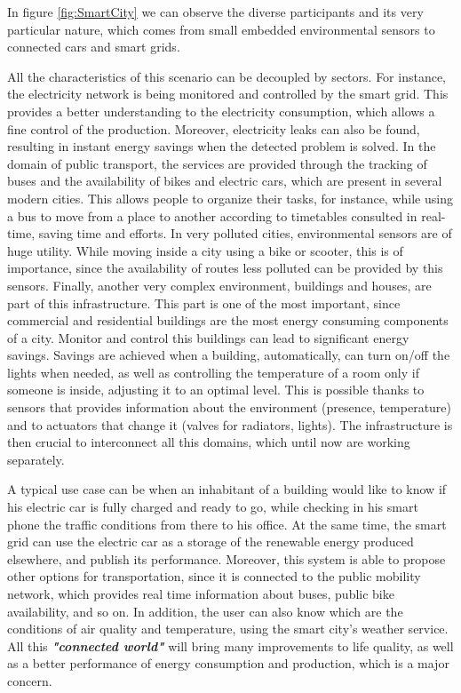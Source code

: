 In figure \ref{fig:SmartCity} we can observe the diverse participants and its very particular nature, which comes from small embedded environmental sensors to connected cars and smart grids.

All the characteristics of this scenario can be decoupled by sectors.
For instance, the electricity network is being monitored and controlled by the smart grid\cite{farhangi2010path}.
This provides a better understanding to the electricity consumption, which allows a fine control of the production.
Moreover, electricity leaks can also be found, resulting in instant energy savings when the detected problem is solved.
In the domain of public transport, the services are provided through the tracking of buses and the availability of bikes and electric cars, which are present in several modern cities.
This allows people to organize their tasks, for instance, while using a bus to move from a place to another according to timetables consulted in real-time, saving time and efforts.
In very polluted cities, environmental sensors are of huge utility.
While moving inside a city using a bike or scooter, this is of importance, since the availability of routes less polluted can be provided by this sensors.
Finally, another very complex environment, buildings and houses, are part of this infrastructure.
This part is one of the most important, since commercial and residential buildings are the most energy consuming components of a city\cite{perezLombard2008energy}.
Monitor and control this buildings can lead to significant energy savings.
Savings are achieved when a building, automatically, can turn on/off the lights when needed, as well as controlling the temperature of a room only if someone is inside, adjusting it to an optimal level.
This is possible thanks to sensors that provides information about the environment (presence, temperature) and to actuators that change it (valves for radiators, lights).
The infrastructure is then crucial to interconnect all this domains, which until now are working separately. 


A typical use case can be when an inhabitant of a building would like to know if his electric car is fully charged and ready to go, while checking in his smart phone the traffic conditions from there to his office.
At the same time, the smart grid can use the electric car as a storage of the renewable energy produced elsewhere, and publish its performance.
Moreover, this system is able to propose other options for transportation, since it is connected to the public mobility network, which provides real time information about buses, public bike availability, and so on.
In addition, the user can also know which are the conditions of air quality and temperature, using the smart city's weather service.
All this \textit{\textbf{"connected world"}} will bring many improvements to life quality, as well as a better performance of energy consumption and production, which is a major concern.

